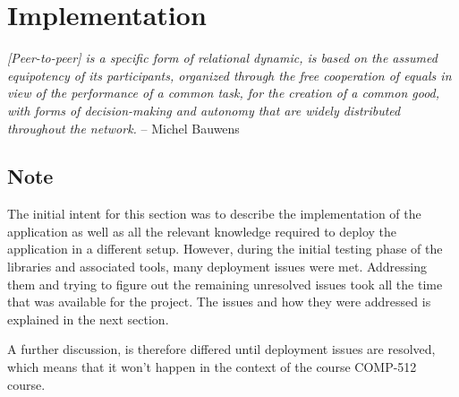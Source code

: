 \chapter{Implementation}

\textit{[Peer-to-peer] is a specific form of relational dynamic, is based on the assumed equipotency of its participants, organized through the free cooperation of equals in view of the performance of a common task, for the creation of a common good, with forms of decision-making and autonomy that are widely distributed throughout the network.} -- Michel Bauwens~\cite{p2pfoundation:definition}

	


\section{Note}

The initial intent for this section was to describe the implementation of the application as well as all the relevant knowledge required to deploy the application in a different setup. However, during the initial testing phase of the libraries and associated tools, many deployment issues were met. Addressing them and trying to figure out the remaining unresolved issues took all the time that was available for the project. The issues and how they were addressed is explained in the next section.

A further discussion, is therefore differed until deployment issues are resolved, which means that it won't happen in the context of the course COMP-512 course.






